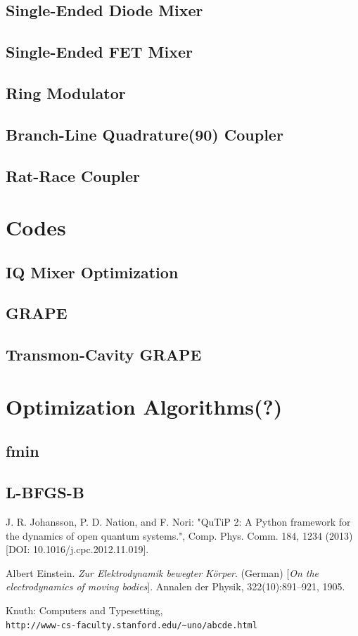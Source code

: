\documentclass[english, a4paper, 12pt, twoside]{article}
\numberwithin{equation}{section} %
\begin{document}
\subsection{Single-Ended Diode Mixer}
\subsection{Single-Ended FET Mixer}
\subsection{Ring Modulator}
\subsection{Branch-Line Quadrature(90\degree) Coupler}
\subsection{Rat-Race Coupler}

\newpage
\section{Codes} \label{appen:Codes}
\subsection{IQ Mixer Optimization}
\subsection{GRAPE}
\subsection{Transmon-Cavity GRAPE}

\newpage
\section{Optimization Algorithms(?)} \label{appen:opt}
\subsection{fmin}
\subsection{L-BFGS-B}

\newpage
\begin{thebibliography}{9}
        J. R. Johansson, P. D. Nation, and F. Nori: "QuTiP 2: A Python framework for the dynamics of open quantum systems.", Comp. Phys. Comm. 184, 1234 (2013) [DOI: 10.1016/j.cpc.2012.11.019].
     
        Albert Einstein. 
        \textit{Zur Elektrodynamik bewegter K{\"o}rper}. (German) 
        [\textit{On the electrodynamics of moving bodies}]. 
        Annalen der Physik, 322(10):891–921, 1905.
     
        Knuth: Computers and Typesetting,\\
        \texttt{http://www-cs-faculty.stanford.edu/\~{}uno/abcde.html}
\end{thebibliography}
\end{document}
